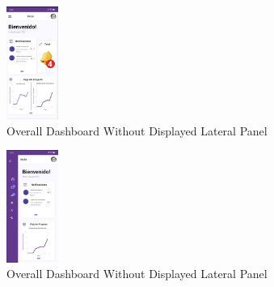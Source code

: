 \documentclass{scrreprt}
\begin{document}
\begin{figure}[H]
    
    \centering \small
    \includegraphics[width=0.15\textwidth]{MobilePrototype/OverallDashboardScreen.jpeg}
    \caption{Overall Dashboard Without Displayed Lateral Panel  }
\end{figure}

\begin{figure}[H]
    
    \centering \small
    \includegraphics[width=0.15\textwidth]{MobilePrototype/OverallLateralOptionsDisplayScreen.jpeg}
    \caption{Overall Dashboard Without Displayed Lateral Panel}
\end{figure}
\end{document}
